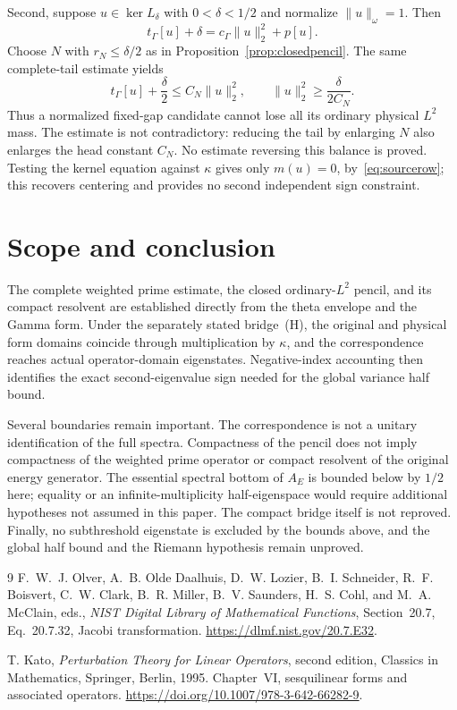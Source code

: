 \documentclass[11pt,a4paper]{article}
\numberwithin{equation}{section}
\theoremstyle{definition}
\theoremstyle{remark}
\newcommand{\tg}{t_{\Gamma}}
\newcommand{\cg}{c_{\Gamma}}
\newcommand{\norm}[1]{\lVert #1\rVert}
\begin{document}
Second, suppose $u\in\ker L_\delta$ with $0<\delta<1/2$ and normalize $\norm{u}_\omega=1$. Then
\begin{equation}\label{eq:stateidentity}
 \tg[u]+\delta=\cg\norm{u}_2^2+p[u].
\end{equation}
Choose $N$ with $r_N\le\delta/2$ as in Proposition~\ref{prop:closedpencil}. The same complete-tail estimate yields
\begin{equation}\label{eq:statebound}
 \tg[u]+\frac\delta2\le C_N\norm{u}_2^2,
 \qquad \norm{u}_2^2\ge\frac{\delta}{2C_N}.
\end{equation}
Thus a normalized fixed-gap candidate cannot lose all its ordinary physical $L^2$ mass. The estimate is not contradictory: reducing the tail by enlarging $N$ also enlarges the head constant $C_N$. No estimate reversing this balance is proved. Testing the kernel equation against $\kappa$ gives only $m(u)=0$, by~\eqref{eq:sourcerow}; this recovers centering and provides no second independent sign constraint.

\section{Scope and conclusion}

The complete weighted prime estimate, the closed ordinary-$L^2$ pencil, and its compact resolvent are established directly from the theta envelope and the Gamma form. Under the separately stated bridge~\textup{(H)}, the original and physical form domains coincide through multiplication by $\kappa$, and the correspondence reaches actual operator-domain eigenstates. Negative-index accounting then identifies the exact second-eigenvalue sign needed for the global variance half bound.

Several boundaries remain important. The correspondence is not a unitary identification of the full spectra. Compactness of the pencil does not imply compactness of the weighted prime operator or compact resolvent of the original energy generator. The essential spectral bottom of $A_E$ is bounded below by $1/2$ here; equality or an infinite-multiplicity half-eigenspace would require additional hypotheses not assumed in this paper. The compact bridge itself is not reproved. Finally, no subthreshold eigenstate is excluded by the bounds above, and the global half bound and the Riemann hypothesis remain unproved.

\begin{thebibliography}{9}
F.~W.~J. Olver, A.~B. Olde Daalhuis, D.~W. Lozier, B.~I. Schneider,
R.~F. Boisvert, C.~W. Clark, B.~R. Miller, B.~V. Saunders, H.~S. Cohl,
and M.~A. McClain, eds.,
\emph{NIST Digital Library of Mathematical Functions},
Section~20.7, Eq.~20.7.32, Jacobi transformation.
\url{https://dlmf.nist.gov/20.7.E32}.

T. Kato, \emph{Perturbation Theory for Linear Operators},
second edition, Classics in Mathematics, Springer, Berlin, 1995.
Chapter~VI, sesquilinear forms and associated operators.
\url{https://doi.org/10.1007/978-3-642-66282-9}.
\end{thebibliography}
\end{document}
